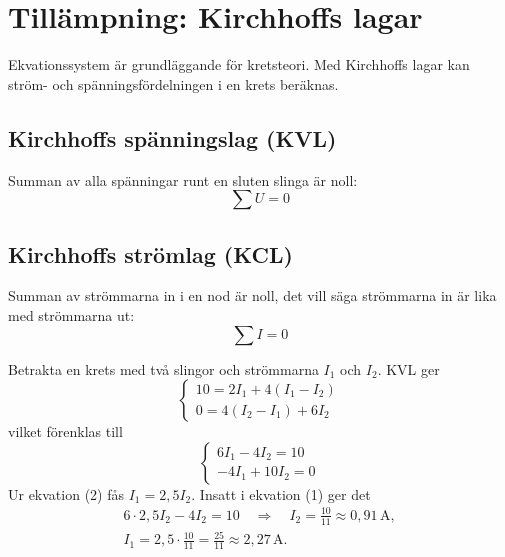 \section{Tillämpning: Kirchhoffs lagar}
\label{c4:sec:kirchhoff}
Ekvationssystem är grundläggande för kretsteori. Med Kirchhoffs lagar kan ström- och
spänningsfördelningen i en krets beräknas.

\subsection{Kirchhoffs spänningslag (KVL)}
\label{c4:sec:kvl}
Summan av alla spänningar runt en sluten slinga är noll:
\[
  \sum U = 0
\]

\subsection{Kirchhoffs strömlag (KCL)}
\label{c4:sec:kcl}
Summan av strömmarna in i en nod är noll, det vill säga strömmarna in är lika med strömmarna ut:
\[
  \sum I = 0
\]

\begin{exempel}
Betrakta en krets med två slingor och strömmarna $I_1$ och $I_2$. KVL ger
\[
  \begin{cases}
    10 = 2I_1 + 4(I_1 - I_2) \\
    0 = 4(I_2 - I_1) + 6I_2
  \end{cases}
\]
vilket förenklas till
\[
  \begin{cases}
    6I_1 - 4I_2 = 10 \\
    -4I_1 + 10I_2 = 0
  \end{cases}
\]
Ur ekvation (2) fås $I_1 = 2{,}5 I_2$. Insatt i ekvation (1) ger det
\begin{gather*}
  6 \cdot 2{,}5 I_2 - 4I_2 = 10 \quad \Rightarrow \quad I_2 = \frac{10}{11} \approx 0{,}91\,\text{A},
  \\
  I_1 = 2{,}5 \cdot \frac{10}{11} = \frac{25}{11} \approx 2{,}27\,\text{A}.
\end{gather*}
\end{exempel}
